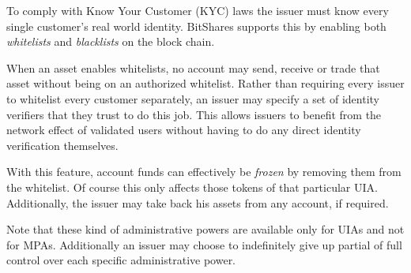 To comply with Know Your Customer (KYC) laws the issuer must know every single
customer's real world identity. BitShares supports this by enabling both
\emph{whitelists} and \emph{blacklists} on the block chain. 

When an asset enables whitelists, no account may send, receive or trade that
asset without being on an authorized whitelist. Rather than requiring every
issuer to whitelist every customer separately, an issuer may specify a set of
identity verifiers that they trust to do this job. This allows issuers to
benefit from the network effect of validated users without having to do any
direct identity verification themselves.

With this feature, account funds can effectively be \emph{frozen} by removing
them from the whitelist. Of course this only affects those tokens of that
particular UIA. Additionally, the issuer may take back his assets from any
account, if required.

Note that these kind of administrative powers are available only for UIAs and
not for MPAs. Additionally an issuer may choose to indefinitely give up partial
of full control over each specific administrative power.
